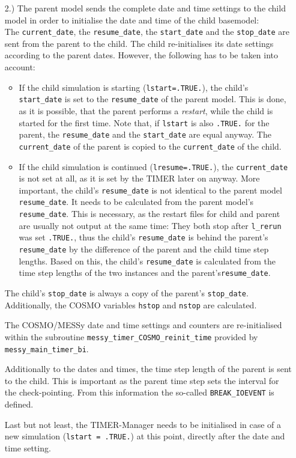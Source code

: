 \documentclass[11pt,twoside]{article}
\begin{document}
\begin{itemize}
\begin{itemize}
\item[2.)] The parent model sends the complete date and time settings to the child model in 
order to initialise the date and time of the child basemodel:\\
The  \verb|current_date|, 
the \verb|resume_date|, the \verb|start_date| and the \verb|stop_date| 
are sent from the parent to the child.
The child re-initialises its date settings according to the parent
 dates.  However, the following has to be taken into account:
\begin{itemize}
\item If the child simulation is starting 
(\verb|lstart=.TRUE.|), the child's \verb|start_date| is set to the 
\verb|resume_date| of the parent model. This is done, as it is possible, that
the parent performs a {\it restart}, while the child is
started for the first time.  
 Note that, if \verb|lstart| is also \verb|.TRUE.| for the
parent, the \verb|resume_date| and the \verb|start_date| are
equal anyway.  The \verb|current_date| of the parent is copied
to the \verb|current_date| of the child.
\item If the child simulation is continued
(\verb|lresume=.TRUE.|), the \verb|current_date|
is not set at all, as it is set by the TIMER later on anyway. More
important, the child's \verb|resume_date| 
is not identical to the parent model \verb|resume_date|. It needs to
be calculated from the parent model's \verb|resume_date|. This is necessary, as
the restart files for child and parent are usually not output at
the same time:
They both stop after \verb|l_rerun| was set \verb|.TRUE.|, thus the
child's  
\verb|resume_date| is behind the parent's \verb|resume_date| by the
difference of the parent and the child time step lengths. Based on this,
the child's \verb|resume_date| is calculated from the time step
lengths of the two instances and the parent's\verb|resume_date|.
\end{itemize}
The child's \verb|stop_date| is always a copy of the parent's \verb|stop_date|. Additionally, the COSMO variables \verb|hstop|
and \verb|nstop| are calculated.

 The COSMO/MESSy date and time settings and counters are
 re-initialised within the
 subroutine \verb|messy_timer_COSMO_reinit_time| provided 
by \verb|messy_main_timer_bi|.

Additionally to the dates and times, the time step length of the parent is
sent to the child. This is important as the parent time
step sets the interval for the check-pointing. From this information
the so-called \verb|BREAK_IOEVENT| is defined.

Last but not least, the TIMER-Manager needs to be initialised in case
of a new simulation (\verb|lstart = .TRUE.|) at this point, directly after the
date and time setting.
\end{itemize}
\end{itemize}
\end{document}
